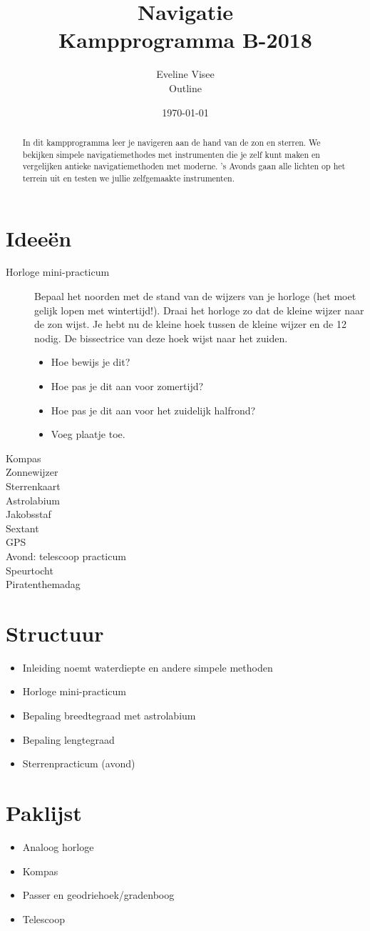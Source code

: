 \documentclass[a4paper,10pt]{article}
\title{Navigatie \\ Kampprogramma B-2018}
\author{Eveline Visee \\ Outline}
\date{\today}
\begin{document}
\maketitle

\begin{abstract}
In dit kampprogramma leer je navigeren aan de hand van de zon en sterren. We bekijken simpele navigatiemethodes met instrumenten die je zelf kunt maken en vergelijken antieke navigatiemethoden met moderne. 's Avonds gaan alle lichten op het terrein uit en testen we jullie zelfgemaakte instrumenten. 
\end{abstract}

\section{Idee\"{e}n}
\begin{description}
 \item [Horloge mini-practicum] Bepaal het noorden met de stand van de wijzers van je horloge (het moet gelijk lopen met wintertijd!). Draai het horloge zo dat de kleine wijzer naar de zon wijst. Je hebt nu de kleine hoek tussen de kleine wijzer en de 12 nodig. De bissectrice van deze hoek wijst naar het zuiden. 
 \begin{itemize}
  \item Hoe bewijs je dit?
  \item Hoe pas je dit aan voor zomertijd?
  \item Hoe pas je dit aan voor het zuidelijk halfrond?
  \item Voeg plaatje toe.
 \end{itemize}
 \item [Kompas]
 \item [Zonnewijzer]
 \item [Sterrenkaart]
 \item [Astrolabium]
 \item [Jakobsstaf]
 \item [Sextant]
 \item [GPS]
 \item [Avond: telescoop practicum]
 \item [Speurtocht]
 \item [Piratenthemadag]
\end{description}

\section{Structuur}
\begin{itemize}
 \item Inleiding noemt waterdiepte en andere simpele methoden
 \item Horloge mini-practicum
 \item Bepaling breedtegraad met astrolabium
 \item Bepaling lengtegraad
 \item Sterrenpracticum (avond)
\end{itemize}


\section{Paklijst}
\begin{itemize}
 \item Analoog horloge
 \item Kompas
 \item Passer en geodriehoek/gradenboog
 \item Telescoop
\end{itemize}
\end{document}
